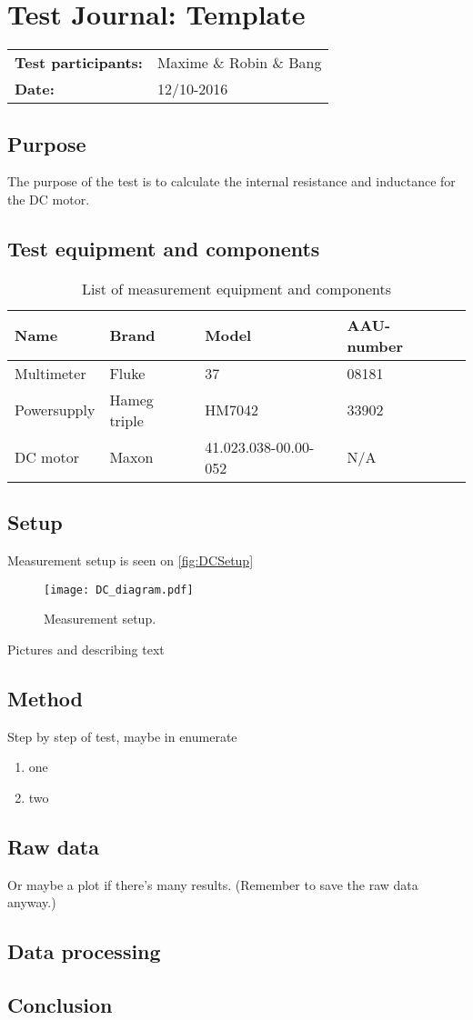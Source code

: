 \graphicspath{{figures/design/}}
\chapter{Test Journal: Template}
\begin{table}[!h]
\begin{tabular}{l l}
\textbf{Test participants:} & Maxime \& Robin \& Bang  \\
\textbf{Date:}  & 12/10-2016
\end{tabular}
\end{table}

\section*{Purpose}
The purpose of the test is to calculate the internal resistance and inductance for the DC motor.
\section*{Test equipment and components}
\begin{table}[h]
	\centering
	\caption{List of measurement equipment and components}\label{tab_appendix:template}

	\begin{tabularx}{\textwidth}{lXXXX}
		Name 				& Brand	& Model & AAU-number									\\ \toprule \rowcolor{lightGrey}
		Multimeter	& Fluke & 37 & 08181 	\\
		Powersupply	& Hameg triple & HM7042 & 33902\\ \rowcolor{lightGrey}
		DC motor & Maxon & 41.023.038-00.00-052& N/A
	\end{tabularx}
\end{table}
\section*{Setup}
Measurement setup is seen on \autoref{fig:DCSetup} \
\begin{figure} [h]
\centering
\texttt{[image: DC\_diagram.pdf]}
\caption{Measurement setup.}
\label{fig:DCSetup}
\end{figure}

Pictures and describing text
\section*{Method}
Step by step of test, maybe in enumerate
\begin{enumerate}
\item one
\item two
\end{enumerate}
\section*{Raw data}
Or maybe a plot if there's many results. (Remember to save the raw data anyway.)
\section*{Data processing}
\section*{Conclusion}


